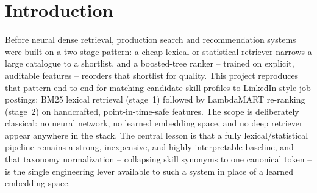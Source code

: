 \section{Introduction}
Before neural dense retrieval, production search and recommendation systems
were built on a two-stage pattern: a cheap lexical or statistical retriever
narrows a large catalogue to a shortlist, and a boosted-tree ranker --
trained on explicit, auditable features -- reorders that shortlist for
quality. This project reproduces that pattern end to end for matching
candidate skill profiles to LinkedIn-style job postings: BM25 lexical
retrieval (stage~1) followed by LambdaMART re-ranking (stage~2) on
handcrafted, point-in-time-safe features. The scope is deliberately
classical: no neural network, no learned embedding space, and no deep
retriever appear anywhere in the stack. The central lesson is that a fully
lexical/statistical pipeline remains a strong, inexpensive, and highly
interpretable baseline, and that taxonomy normalization -- collapsing skill
synonyms to one canonical token -- is the single engineering lever available
to such a system in place of a learned embedding space.
